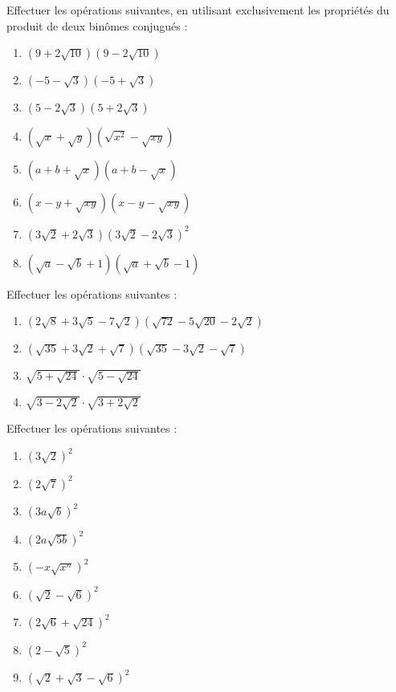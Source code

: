 \begin{exercice}
Effectuer les opérations suivantes, en utilisant exclusivement les propriétés du produit de deux binômes  conjugués :
\begin{multicols}{2}
\begin{enumerate}
\item $\left( 9+2\sqrt{10} \right)\left( 9-2\sqrt{10} \right)$ 
\item $\left( -5-\sqrt{3} \right)\left( -5+\sqrt{3} \right)$ 
\item $\left( 5-2\sqrt{3} \right)\left( 5+2\sqrt{3} \right)$ 
\item $\left( \sqrt{x}+\sqrt{y} \right)\left( \sqrt{{{x}^{2}}}-\sqrt{xy} \right)$ 
\item $\left( a+b+\sqrt{x} \right)\left( a+b-\sqrt{x} \right)$
\item $\left( x-y+\sqrt{xy} \right)\left( x-y-\sqrt{xy} \right)$
\item $\left( 3\sqrt{2}+2\sqrt{3} \right){{\left( 3\sqrt{2}-2\sqrt{3} \right)}^{2}}$
\item $\left( \sqrt{a}-\sqrt{b}+1 \right)\left( \sqrt{a}+\sqrt{b}-1 \right)$
\end{enumerate}
\end{multicols}
\end{exercice}

\begin{exercice}
Effectuer les opérations suivantes :
\begin{enumerate}
\item $\left( 2\sqrt{8}+3\sqrt{5}-7\sqrt{2} \right)\left( \sqrt{72}-5\sqrt{20}-2\sqrt{2} \right)$ 
\item $\left( \sqrt{35}+3\sqrt{2}+\sqrt{7} \right)\left( \sqrt{35}-3\sqrt{2}-\sqrt{7} \right)$ 
\item $\sqrt{5+\sqrt{24}}\cdot \sqrt{5-\sqrt{24}}$
\item $\sqrt{3-2\sqrt{2}}\cdot \sqrt{3+2\sqrt{2}}$
\end{enumerate}
\end{exercice}

\begin{exercice}
Effectuer les opérations suivantes :
\begin{multicols}{3}
\begin{enumerate}
\item ${{\left( 3\sqrt{2} \right)}^{2}}$ 
\item ${{\left( 2\sqrt{7} \right)}^{2}}$
\item ${{\left( 3a\sqrt{b} \right)}^{2}}$
\item ${{\left( 2a\sqrt{5b} \right)}^{2}}$
\item ${{\left( -x\sqrt{{{x}^{n}}} \right)}^{2}}$
\item ${{\left( \sqrt{2}-\sqrt{6} \right)}^{2}}$
\item ${{\left( 2\sqrt{6}+\sqrt{24} \right)}^{2}}$
\item ${{\left( 2-\sqrt{5} \right)}^{2}}$
\item ${{\left( \sqrt{2}+\sqrt{3}-\sqrt{6} \right)}^{2}}$
\end{enumerate}
\end{multicols}
\end{exercice}

